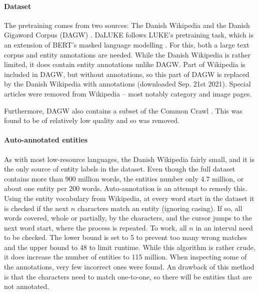 \documentclass[10pt, a4paper]{article}
\begin{document}
\paragraph{Dataset}
The pretraining comes from two sources: The Danish Wikipedia and the Danish Gigaword Corpus (DAGW) \cite{derc2021giga}.
DaLUKE follows LUKE's pretraining task, which is an extension of BERT's masked language modelling \cite{devlin2019bert} \cite{yamada2020luke}.
For this, both a large text corpus and entity annotations are needed.
While the Danish Wikipedia is rather limited, it does contain entity annotations unlike DAGW.
Part of Wikipedia is included in DAGW, but without annotations, so this part of DAGW is replaced by the Danish Wikipedia with annotations (downloaded Sep. 21st 2021).
Special articles were removed from Wikipedia -- most notably category and image pages.

Furthermore, DAGW also contains a subset of the Common Crawl \cite{cc}.
This was found to be of relatively low quality and so was removed.

\paragraph{Auto-annotated entities}
As with most low-resource languages, the Danish Wikipedia fairly small, and it is the only source of entity labels in the dataset.
Even though the full dataset contains more than 900 million words, the entities number only 4.7 million, or about one entity per 200 words.
Auto-annotation is an attempt to remedy this.
Using the entity vocabulary from Wikipedia, at every word start in the dataset it is checked if the next $ n $ characters match an entity (ignoring casing).
If so, all words covered, whole or partially, by the characters, and the cursor jumps to the next word start, where the process is repeated.
To work, all $ n $ in an interval need to be checked.
The lower bound is set to 5 to prevent too many wrong matches and the upper bound to 48 to limit runtime.
While this algorithm is rather crude, it does increase the number of entities to 115 million.
When inspecting some of the annotations, very few incorrect ones were found.
An drawback of this method is that the characters need to match one-to-one, so there will be entities that are not annotated.
\end{document}
